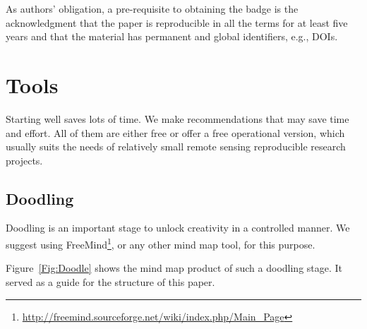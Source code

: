 \documentclass[journal,twoside]{IEEEtran}
\begin{document}
As authors' obligation, a pre-requisite to obtaining the badge is the acknowledgment that the paper is reproducible in all the terms for at least five years and that the material has permanent and global identifiers, e.g., DOIs.

\section{Tools}\label{Sec:Tools}

Starting well saves lots of time.
We make recommendations that may save time and effort.
All of them are either free or offer a free operational version, which usually suits the needs of relatively small remote sensing reproducible research projects.

\subsection{Doodling}

Doodling is an important stage to unlock creativity in a controlled manner.
We suggest using FreeMind\footnote{\url{http://freemind.sourceforge.net/wiki/index.php/Main_Page}}, or any other mind map tool, for this purpose.

Figure~\ref{Fig:Doodle} shows the mind map product of such a doodling stage.
It served as a guide for the structure of this paper.
\end{document}

